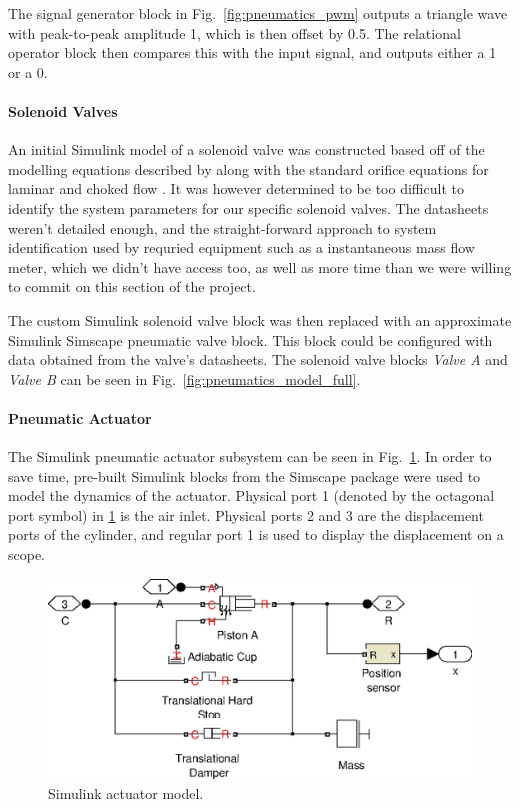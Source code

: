 The signal generator block in Fig.\ \ref{fig:pneumatics_pwm} outputs a triangle wave with peak-to-peak amplitude 1, which is then offset by 0.5. The relational operator block then compares this with the input signal, and outputs either a 1 or a 0.

\paragraph{Solenoid Valves}

An initial Simulink model of a solenoid valve was constructed based off of the modelling equations described by \citet{valve_models} along with the standard orifice equations for laminar and choked flow \cite{fluid_power}. It was however determined to be too difficult to identify the system parameters for our specific solenoid valves. The datasheets weren't detailed enough, and the straight-forward approach to system identification used by \cite{valve_models} requried equipment such as a instantaneous mass flow meter, which we didn't have access too, as well as more time than we were willing to commit on this section of the project.

The custom Simulink solenoid valve block was then replaced with an approximate Simulink Simscape pneumatic valve block. This block could be configured with data obtained from the valve's datasheets. The solenoid valve blocks \emph{Valve A} and \emph{Valve B} can be seen in Fig.\ \ref{fig:pneumatics_model_full}.

\paragraph{Pneumatic Actuator}

The Simulink pneumatic actuator subsystem can be seen in Fig.\ \ref{fig:pneumatics_actuator}. In order to save time, pre-built Simulink blocks from the Simscape package were used to model the dynamics of the actuator. Physical port 1 (denoted by the octagonal port symbol) in \ref{fig:pneumatics_actuator} is the air inlet. Physical ports 2 and 3 are the displacement ports of the cylinder, and regular port 1 is used to display the displacement on a scope.

\begin{figure}[H]
\centering
\includegraphics[scale=0.65]{implementation/figures/pneumatic_modelling3}
\caption{Simulink actuator model.}
\label{fig:pneumatics_actuator}
\end{figure}

